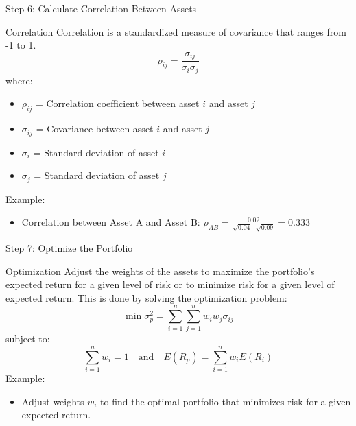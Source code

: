 \documentclass{beamer}
\begin{document}
\begin{frame}{Step 6: Calculate Correlation Between Assets}
  \begin{block}{Correlation}
    Correlation is a standardized measure of covariance that ranges from -1 to 1.
    \begin{equation*}
      \rho_{ij} = \frac{\sigma_{ij}}{\sigma_i \sigma_j}
    \end{equation*}
    where:
    \begin{itemize}
      \item \( \rho_{ij} \) = Correlation coefficient between asset \( i \) and asset \( j \)
      \item \( \sigma_{ij} \) = Covariance between asset \( i \) and asset \( j \)
      \item \( \sigma_i \) = Standard deviation of asset \( i \)
      \item \( \sigma_j \) = Standard deviation of asset \( j \)
    \end{itemize}
    Example:
    \begin{itemize}
      \item Correlation between Asset A and Asset B: \(\rho_{AB} = \frac{0.02}{\sqrt{0.04} \cdot \sqrt{0.09}} = 0.333\)
    \end{itemize}
  \end{block}
\end{frame}

\begin{frame}{Step 7: Optimize the Portfolio}
  \begin{block}{Optimization}
    Adjust the weights of the assets to maximize the portfolio's expected return for a given level of risk or to minimize risk for a given level of expected return. This is done by solving the optimization problem:
    \begin{equation*}
      \min \sigma_p^2 = \sum_{i=1}^{n} \sum_{j=1}^{n} w_i w_j \sigma_{ij}
    \end{equation*}
    subject to:
    \begin{equation*}
      \sum_{i=1}^{n} w_i = 1 \quad \text{and} \quad E(R_p) = \sum_{i=1}^{n} w_i E(R_i)
    \end{equation*}
    Example:
    \begin{itemize}
      \item Adjust weights \(w_i\) to find the optimal portfolio that minimizes risk for a given expected return.
    \end{itemize}
  \end{block}
\end{frame}
\end{document}
